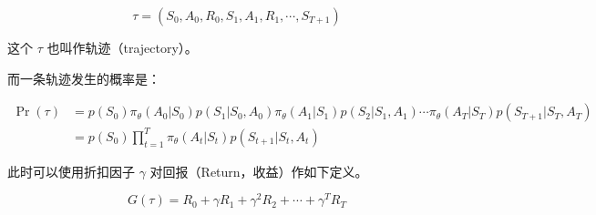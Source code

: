 \documentclass[lang=cn,newtx,10pt,scheme=chinese]{elegantbook}
\begin{document}
\begin{equation}
\tau = (S_0, A_0, R_0, S_1, A_1, R_1, \cdots, S_{T+1})
\end{equation}

这个 $\tau$ 也叫作轨迹（trajectory）。

而一条轨迹发生的概率是：

\begin{equation}
\begin{aligned}
\Pr(\tau)
&=p\left(S_{0}\right) \pi_{\theta}\left(A_{0} | S_{0}\right) p\left(S_{1} | S_{0}, A_{0}\right) \pi_{\theta}\left(A_{1} | S_{1}\right) p\left(S_{2} | S_{1}, A_{1}\right) \cdots \pi_{\theta}\left(A_{T} | S_{T}\right) p\left(S_{T+1} | S_{T}, A_{T}\right) \\
&=p\left(S_{0}\right) \prod_{t=1}^{T} \pi_{\theta}\left(A_{t} | S_{t}\right) p\left(S_{t+1} | S_{t}, A_{t}\right)
\end{aligned}
\end{equation}

此时可以使用折扣因子 $\gamma$ 对回报（Return，收益）作如下定义。

\begin{equation}
G(\tau) = R_0 + \gamma R_1 + \gamma^2 R_2 + \cdots + \gamma^T R_T
\end{equation}
\end{document}
